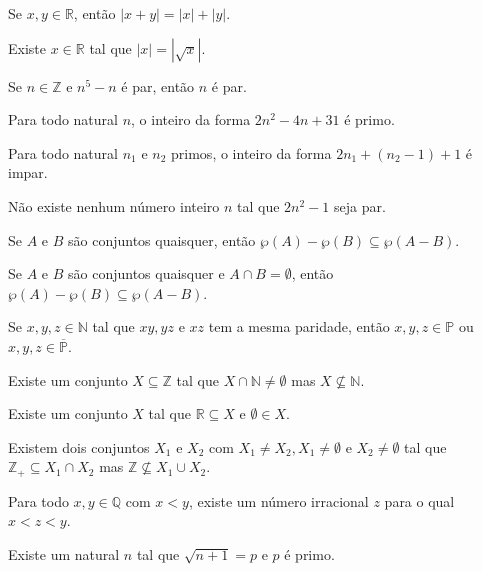 \begin{exerList}
	\item Se $x, y \in \mathbb{R}$, então $|x + y| = |x| + |y|$.
	\item Existe $x \in \mathbb{R}$ tal que $|x| = |\sqrt{x}|$.
	\item Se $n \in \mathbb{Z}$ e $n^5 - n$ é par, então $n$ é par.
	\item Para todo natural $n$, o inteiro da forma $2n^2 -4n + 31$ é primo.
	\item Para todo natural $n_1$ e $n_2$ primos, o inteiro da forma $2n_1 + (n_2 - 1) + 1$ é impar.
	\item Não existe nenhum número inteiro $n$ tal que $2n^2 - 1$ seja par.
	\item Se $A$ e $B$ são conjuntos quaisquer, então $\wp(A) - \wp(B) \subseteq \wp(A - B)$.
	\item Se $A$ e $B$ são conjuntos quaisquer e $A \cap B = \emptyset$, então $\wp(A) - \wp(B) \subseteq \wp(A - B)$.
	\item Se $x, y, z \in \mathbb{N}$ tal que $xy, yz$ e $xz$ tem a mesma paridade, então $x, y, z \in \mathbb{P}$ ou $x, y, z \in \overline{\mathbb{P}}$.
	\item Existe um conjunto $X \subseteq \mathbb{Z}$ tal que $X \cap \mathbb{N} \neq \emptyset$ mas $X \not\subseteq \mathbb{N}$.
	\item Existe um conjunto $X$ tal que $\mathbb{R} \subseteq X$ e $\emptyset \in X$.
	\item Existem dois conjuntos $X_1$ e $X_2$ com $X_1 \neq X_2, X_1 \neq \emptyset$ e $X_2 \neq \emptyset$ tal que $\mathbb{Z}_+ \subseteq X_1 \cap X_2$ mas $\mathbb{Z} \not\subseteq X_1 \cup X_2$.
	\item Para todo $x, y \in \mathbb{Q}$ com $x < y$, existe um número irracional $z$ para o qual $x < z < y$.
	\item Existe um natural $n$ tal que $\sqrt{n + 1} = p$ e $p$ é primo.

\end{exerList}
